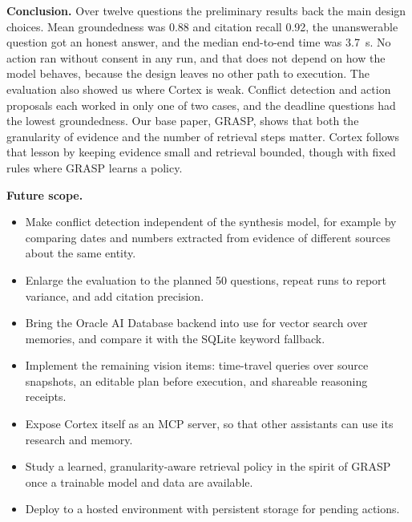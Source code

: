 \documentclass[oneside,a4paper,12pt]{report}
\begin{document}
\textbf{Conclusion.} Over twelve questions the preliminary results back the main design choices. Mean groundedness was 0.88 and citation recall 0.92, the unanswerable question got an honest answer, and the median end-to-end time was 3.7~s. No action ran without consent in any run, and that does not depend on how the model behaves, because the design leaves no other path to execution. The evaluation also showed us where Cortex is weak. Conflict detection and action proposals each worked in only one of two cases, and the deadline questions had the lowest groundedness. Our base paper, GRASP, shows that both the granularity of evidence and the number of retrieval steps matter. Cortex follows that lesson by keeping evidence small and retrieval bounded, though with fixed rules where GRASP learns a policy.

\textbf{Future scope.}
\begin{itemize}
\item Make conflict detection independent of the synthesis model, for example by comparing dates and numbers extracted from evidence of different sources about the same entity.
\item Enlarge the evaluation to the planned 50 questions, repeat runs to report variance, and add citation precision.
\item Bring the Oracle AI Database backend into use for vector search over memories, and compare it with the SQLite keyword fallback.
\item Implement the remaining vision items: time-travel queries over source snapshots, an editable plan before execution, and shareable reasoning receipts.
\item Expose Cortex itself as an MCP server, so that other assistants can use its research and memory.
\item Study a learned, granularity-aware retrieval policy in the spirit of GRASP once a trainable model and data are available.
\item Deploy to a hosted environment with persistent storage for pending actions.
\end{itemize}

% 



\end{document}
